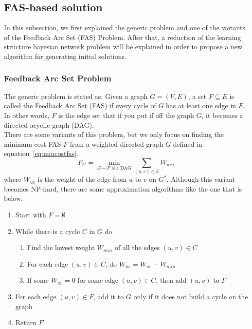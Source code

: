 \subsection{FAS-based solution}
\label{subsec:fasapproach}

In this subsection, we first explained the generic problem and one of the variants of the Feedback Arc Set (FAS) Problem. After that, a reduction of the learning structure bayesian network problem will be explained in order to propose a new algorithm for generating initial solutions.

\subsubsection{Feedback Arc Set Problem} \label{subsub:fasp}

The generic problem is stated as: Given a graph $G = ( V , E )$, a set $F \subseteq E$ is called the Feedback Arc Set (FAS) if every cycle of $G$ has at least one edge in $F$. In other words, $F$ is the edge set that if you put if off the graph $G$, it becomes a directed acyclic graph (DAG).\\
There are some variants of this problem, but we only focus on finding the minimum cost FAS $F$ from a weighted directed graph $G$ defined in equation~\ref{eq:mincostfas}.
\begin{equation}
	\label{eq:mincostfas}
	F_{G} = \min_{G - F \text{ is a DAG}} \sum_{(u,v) \in E} W_{uv} ,
\end{equation}
where $W_{uv}$ is the weight of the edge from $u$ to $v$ on $G^*$. Although this variant becomes NP-hard, there are some approximation algorithms like the one that is below.
\begin{enumerate}
	\item Start with $F = \emptyset$
	\item While there is a cycle $C$ in $G$ do
	\begin{enumerate}
		\item Find the lowest weight $W_{min}$ of all the edges $(u,v) \in C$
		\item For each edge $(u,v) \in C$, do $W_{uv} = W_{uv} - W_{min}$
		\item If some $W_{uv} = 0$ for some edge $(u,v) \in C$, then add $(u,v)$ to $F$
	\end{enumerate}
	\item For each edge $(u,v) \in F$, add it to $G$ only if it does not build a cycle on the graph
	\item Return $F$
\end{enumerate}

